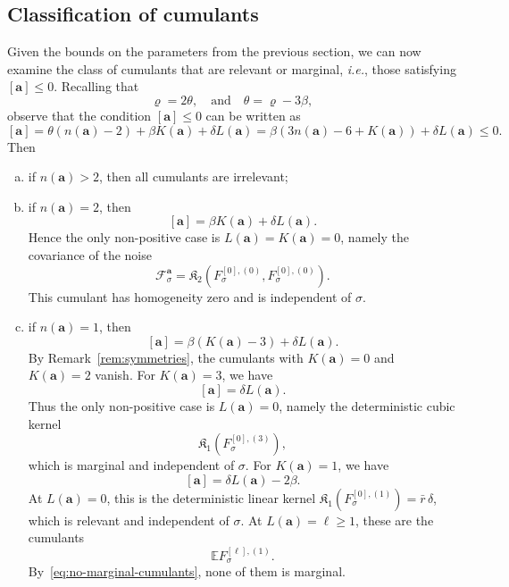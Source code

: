 \documentclass{article}
\numberwithin{equation}{section}
\theoremstyle{plain}
\theoremstyle{definition}
\begin{document}
\subsection{Classification of
cumulants}\label{sec:class-rel-cumulants}

Given the bounds on the parameters from the previous section, we can now
examine the class of cumulants that are relevant or marginal, \textit{i.e.},
those satisfying $[\boldsymbol{a}] \leqslant 0$. Recalling that
\[ \varrho = 2 \theta, \quad \text{and} \quad \theta = \varrho - 3 \beta, \]
observe that the condition $[\boldsymbol{a}] \leqslant 0$ can be written as
\[
  [\boldsymbol{a}] = \theta (n (\boldsymbol{a}) - 2) + \beta K
  (\boldsymbol{a}) + \delta L (\boldsymbol{a}) = \beta (3 n
  (\boldsymbol{a}) - 6 + K (\boldsymbol{a})) + \delta L (\boldsymbol{a})
  \leqslant 0.
\]
Then
\begin{enumerate}[(a)]
  \item if $n (\boldsymbol{a}) > 2$, then all cumulants are irrelevant;
  
  \item if $n (\boldsymbol{a}) = 2$, then
  \[
    [\boldsymbol{a}] = \beta K (\boldsymbol{a}) + \delta L (\boldsymbol{a}) .
  \]
  Hence the only non-positive case is
  $L (\boldsymbol{a}) = K (\boldsymbol{a}) = 0$, namely the covariance of the
  noise
  \[
    \mathcal{F}^{\boldsymbol{a}}_{\sigma} =
    \mathfrak{K}_2 (F^{[0], (0)}_{\sigma}, F^{[0], (0)}_{\sigma}) .
  \]
  This cumulant has homogeneity zero and is independent of $\sigma$.
  
  \item if $n (\boldsymbol{a}) = 1$, then
  \[
    [\boldsymbol{a}] = \beta (K (\boldsymbol{a}) - 3) + \delta L
    (\boldsymbol{a}) .
  \]
  By Remark~\ref{rem:symmetries}, the cumulants with $K (\boldsymbol{a}) = 0$
  and $K (\boldsymbol{a}) = 2$ vanish. For $K (\boldsymbol{a}) = 3$, we have
  \[
    [\boldsymbol{a}] = \delta L (\boldsymbol{a}) .
  \]
  Thus the only non-positive case is $L (\boldsymbol{a}) = 0$, namely the
  deterministic cubic kernel
  \[
    \mathfrak{K}_1 (F_{\sigma}^{[0], (3)}) ,
  \]
  which is marginal and independent of $\sigma$. For $K (\boldsymbol{a}) = 1$,
  we have
  \[
    [\boldsymbol{a}] = \delta L (\boldsymbol{a}) - 2 \beta .
  \]
  At $L (\boldsymbol{a}) = 0$, this is the deterministic linear kernel
  $\mathfrak{K}_1 (F_{\sigma}^{[0], (1)}) = \bar{r}\,\delta$,
  which is relevant and independent of $\sigma$. At
  $L (\boldsymbol{a}) = \ell \geqslant 1$, these are the cumulants
  \[
    \mathbb{E} F_{\sigma}^{[\ell], (1)} .
  \]
  By~\eqref{eq:no-marginal-cumulants}, none of them is marginal.
\end{enumerate}
\end{document}
